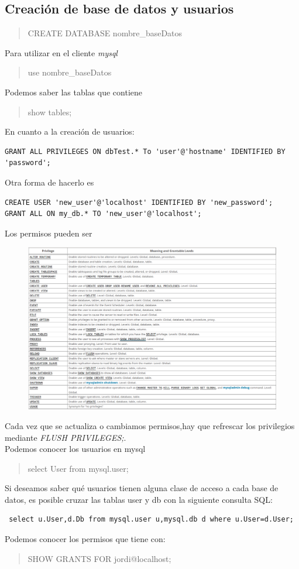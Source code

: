 \documentclass[4paper]{article}
\newcommand{\M}{mysql}
\begin{document}
\subsection{Creación de base de datos y usuarios}
\begin{quote}
CREATE DATABASE nombre\_baseDatos
\end{quote}
Para utilizar en el cliente \emph{\M}
\begin{quote}
use nombre\_baseDatos
\end{quote}
Podemos saber las tablas que contiene
\begin{quote}
show tables;
\end{quote}
En cuanto a la creación de usuarios:
\begin{verbatim}
GRANT ALL PRIVILEGES ON dbTest.* To 'user'@'hostname' IDENTIFIED BY 'password';
\end{verbatim}
Otra forma de hacerlo es
\begin{verbatim}
CREATE USER 'new_user'@'localhost' IDENTIFIED BY 'new_password';
GRANT ALL ON my_db.* TO 'new_user'@'localhost';
\end{verbatim}
Los permisos pueden ser
\begin{figure}[H]
\includegraphics[scale=0.5]{../imagenes/mysql.png}
\end{figure}
Cada vez que se actualiza o cambiamos permisos,hay que refrescar los privilegios mediante \emph{FLUSH PRIVILEGES;}.\\
\newpage
Podemos conocer los usuarios en \M
\begin{quote}
select User from mysql.user;
\end{quote}
Si deseamos saber qué usuarios tienen alguna clase de acceso a cada base de datos, es posible cruzar las tablas user y db con la siguiente consulta SQL:
\begin{verbatim}
 select u.User,d.Db from mysql.user u,mysql.db d where u.User=d.User;
\end{verbatim}
Podemos conocer los permisos que tiene con:
\begin{quote}
SHOW GRANTS FOR jordi@localhost;
\end{quote}
\end{document}
